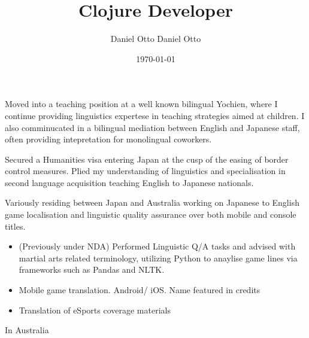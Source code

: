 \documentclass[10pt,a4paper,ragged2e,withhyper]{altacv}
\author{Daniel Otto Daniel Otto}
\date{\today}
\title{Clojure Developer}
\begin{document}

\makecvheader

\begin{paracol}{2}

\label{sec:org8f1dcb4}
Moved into a teaching position at a well known bilingual Yochien, where I continue providing linguistics expertese in teaching strategies aimed at children. I also comminucated in a bilingual mediation between English and Japanese staff, often providing intepretation for monolingual coworkers.
\par\divider
{}
Secured a Humanities visa entering Japan at the cusp of the easing of border control measures. Plied my understanding of linguistics and specialisation in second language acquisition teaching English to Japanese nationals.
\par\divider
{}
Variously residing between Japan and Australia working on Japanese to English game localisation and linguistic quality assurance over both mobile and console titles.

\label{sec:org3e8b569}
\begin{itemize}
\item (Previously under NDA) Performed Linguistic Q/A tasks and advised with martial arts related terminology, utilizing Python to anaylise game lines via frameworks such as Pandas and NLTK.
\end{itemize}
\begin{itemize}
\item Mobile game translation. Android/ iOS. Name featured in credits
\end{itemize}
\begin{itemize}
\item Translation of eSports coverage materials
\end{itemize}
\label{sec:org7313c52}
In Australia
\switchcolumn


\end{paracol}
\end{document}
